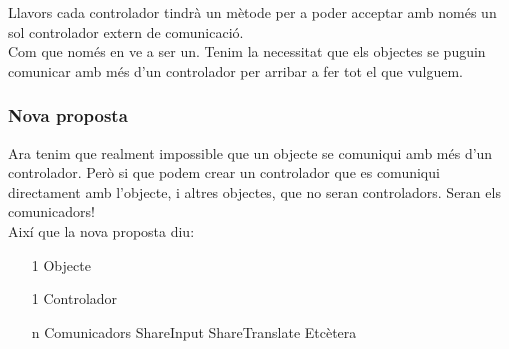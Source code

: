 \documentclass{article}
\begin{document}
Llavors cada controlador tindrà un mètode per a poder acceptar amb només un sol controlador extern de comunicació.\\
Com que només en ve a ser un. Tenim la necessitat que els objectes se puguin comunicar amb més d'un controlador per arribar a fer tot el que
vulguem.

\subsubsection{Nova proposta}
Ara tenim que realment impossible que un objecte se comuniqui amb més d'un controlador. Però si que podem crear un controlador que es comuniqui
directament amb l'objecte, i altres objectes, que no seran controladors. Seran els comunicadors!\\

Així que la nova proposta diu:
\begin{itemize}
\item[1] Objecte
\item[1] Controlador
\item[n] Comunicadors
	\subitem ShareInput
	\subitem ShareTranslate
	\subitem Etcètera
\end{itemize}
\end{document}
